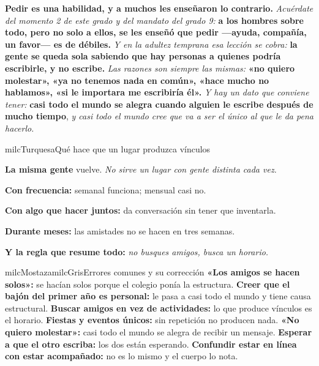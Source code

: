 \documentclass[11pt,letterpaper]{article}
\newcommand{\milcpaso}[3]{%
\Needspace{4\baselineskip}%
\begin{tcolorbox}[enhanced,colback=white,colframe=milcLinea,arc=1.5mm,boxrule=.9pt,
  left=14mm,right=4mm,top=3mm,bottom=3mm,before skip=4pt,after skip=4pt,
  fontupper=\RaggedRight,
  overlay={\node[anchor=north west,circle,fill=#2,text=white,inner sep=0pt,
    minimum size=7.4mm,font=\sffamily\bfseries\small]
    at ([xshift=3.6mm,yshift=-3.2mm]frame.north west) {#1};}]
#3
\end{tcolorbox}}
\begin{document}
\milcpaso{4}{milcTurquesa}{\textbf{Pedir es una habilidad, y a muchos les enseñaron lo contrario.} \emph{Acuérdate del momento 2 de este grado y del mandato del grado 9:} \textbf{a los hombres sobre todo, pero no solo a ellos, se les enseñó que pedir ---ayuda, compañía, un favor--- es de débiles.} \emph{Y en la adultez temprana esa lección se cobra:} \textbf{la gente se queda sola sabiendo que hay personas a quienes podría escribirle, y no escribe.} \emph{Las razones son siempre las mismas:} \textbf{«no quiero molestar», «ya no tenemos nada en común», «hace mucho no hablamos», «si le importara me escribiría él».} \emph{Y hay un dato que conviene tener:} \textbf{casi todo el mundo se alegra cuando alguien le escribe después de mucho tiempo}, \emph{y casi todo el mundo cree que va a ser el único al que le da pena hacerlo.}}

\begin{drawbox}{milcTurquesa}{Qué hace que un lugar produzca vínculos}
\begin{pasoslista}
\item \textbf{La misma gente} vuelve. \emph{No sirve un lugar con gente distinta cada vez.}
\item \textbf{Con frecuencia:} semanal funciona; mensual casi no.
\item \textbf{Con algo que hacer juntos:} da conversación sin tener que inventarla.
\item \textbf{Durante meses:} las amistades no se hacen en tres semanas.
\item \textbf{Y la regla que resume todo:} \emph{no busques amigos, busca un horario.}
\end{pasoslista}
\end{drawbox}

\begin{softbox}{milcMostaza}{milcGris}{Errores comunes y su corrección}
\textbf{«Los amigos se hacen solos»:} se hacían solos porque el colegio ponía la estructura. \textbf{Creer que el bajón del primer año es personal:} le pasa a casi todo el mundo y tiene causa estructural. \textbf{Buscar amigos en vez de actividades:} lo que produce vínculos es el horario. \textbf{Fiestas y eventos únicos:} sin repetición no producen nada. \textbf{«No quiero molestar»:} casi todo el mundo se alegra de recibir un mensaje. \textbf{Esperar a que el otro escriba:} los dos están esperando. \textbf{Confundir estar en línea con estar acompañado:} no es lo mismo y el cuerpo lo nota.
\end{softbox}
\end{document}
